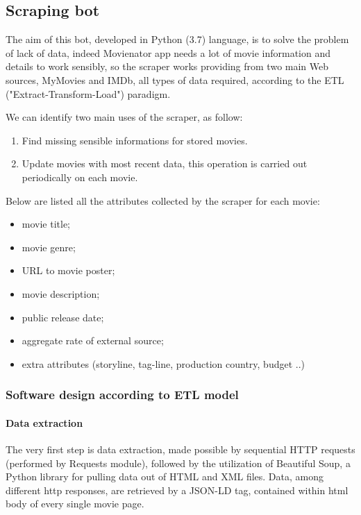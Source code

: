 \documentclass[11pt]{article}
\begin{document}
\subsection{Scraping bot}
The aim of this bot, developed in Python (3.7) language, is to solve the problem of lack of data, indeed Movienator app needs a lot of movie information and details to work sensibly, so the scraper works providing from two main Web sources, MyMovies and IMDb, all types of data required, according to the ETL ("Extract-Transform-Load") paradigm.

We can identify two main uses of the scraper, as follow:
\begin{enumerate}
    \item Find missing sensible informations for stored movies.
    \item Update movies with most recent data, this operation is carried out periodically on each movie.
\end{enumerate}
Below are listed all the attributes collected by the scraper for each movie:\newline
\begin{itemize}
    \item movie title;
    \item movie genre;
    \item URL to movie poster;
    \item movie description;
    \item public release date;
    \item aggregate rate of external source;
    \item extra attributes (storyline, tag-line, production country, budget ..)
\end{itemize}

\subsubsection{Software design according to ETL model}
\paragraph{Data extraction}
The very first step is data extraction, made possible by sequential HTTP requests (performed by Requests module), followed by the utilization of Beautiful Soup, a Python library for pulling data out of HTML and XML files.
Data, among different http responses, are retrieved by a JSON-LD tag, contained within html body of every single movie page.

\end{document}

